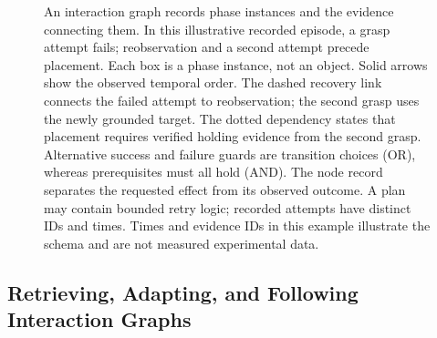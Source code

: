 \documentclass[10pt,twocolumn,letterpaper]{article}
\begin{document}
\begin{figure}[t]
{{}
}
\caption{An interaction graph records phase instances and the evidence connecting them. In this illustrative recorded episode, a grasp attempt fails; reobservation and a second attempt precede placement. Each box is a phase instance, not an object. Solid arrows show the observed temporal order. The dashed recovery link connects the failed attempt to reobservation; the second grasp uses the newly grounded target. The dotted dependency states that placement requires verified holding evidence from the second grasp. Alternative success and failure guards are transition choices (OR), whereas prerequisites must all hold (AND). The node record separates the requested effect from its observed outcome. A plan may contain bounded retry logic; recorded attempts have distinct IDs and times. Times and evidence IDs in this example illustrate the schema and are not measured experimental data.}
\label{fig:semantics}
\end{figure}


\subsection{Retrieving, Adapting, and Following Interaction Graphs}
\label{sec:graph-use}
\end{document}
